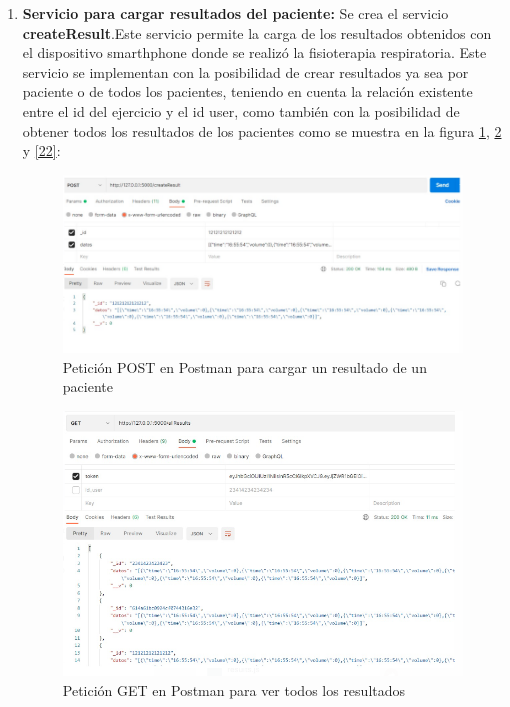 \documentclass[12pt]{article}
\begin{document}
\begin{enumerate}
            
    \item \textbf{Servicio para cargar resultados del paciente:} Se crea el servicio \textbf{createResult}.Este servicio permite la carga de los resultados obtenidos con el dispositivo smarthphone donde se realizó la fisioterapia respiratoria. Este servicio se implementan con la posibilidad de crear resultados ya sea por paciente o de todos los pacientes, teniendo en cuenta la relación existente entre el id del ejercicio y el id user, como también con la posibilidad de obtener todos los resultados de los pacientes como se muestra en la figura \ref{20}, \ref{21} y \ref{22}:
    
            \begin{figure}[ht]
            \centering
            \includegraphics[scale=0.3]{imag/createresult.png}
            \caption{Petición POST en Postman para cargar un resultado de un paciente }
            \label{20}
            \end{figure}
            \FloatBarrier
            
            
            \begin{figure}[ht]
            \centering
            \includegraphics[scale=0.3]{imag/allresults.png}
            \caption{Petición GET en Postman para ver todos los resultados }
            \label{21}
            \end{figure}
            \FloatBarrier
            

\end{enumerate}
\end{document}

